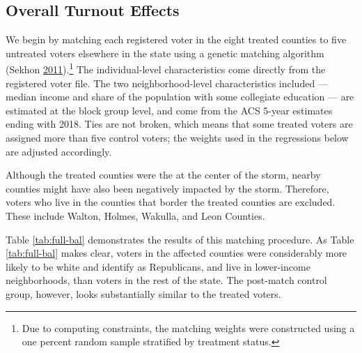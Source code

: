 \documentclass[
  12pt,
]{article}
\begin{document}
\hypertarget{overall-turnout-effects}{%
\subsection*{Overall Turnout Effects}\label{overall-turnout-effects}}

We begin by matching each registered voter in the eight treated counties to five untreated voters elsewhere in the state using a genetic matching algorithm (Sekhon \protect\hyperlink{ref-Sekhon2011}{2011}).\footnote{Due to computing constraints, the matching weights were constructed using a one percent random sample stratified by treatment status.} The individual-level characteristics come directly from the registered voter file. The two neighborhood-level characteristics included --- median income and share of the population with some collegiate education --- are estimated at the block group level, and come from the ACS 5-year estimates ending with 2018. Ties are not broken, which means that some treated voters are assigned more than five control voters; the weights used in the regressions below are adjusted accordingly.

Although the treated counties were the at the center of the storm, nearby counties might have also been negatively impacted by the storm. Therefore, voters who live in the counties that border the treated counties are excluded. These include Walton, Holmes, Wakulla, and Leon Counties.

Table \ref{tab:full-bal} demonstrates the results of this matching procedure. As Table \ref{tab:full-bal} makes clear, voters in the affected counties were considerably more likely to be white and identify as Republicans, and live in lower-income neighborhoods, than voters in the rest of the state. The post-match control group, however, looks substantially similar to the treated voters.
\end{document}
